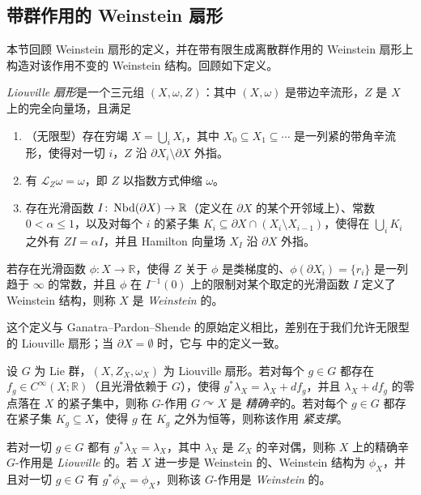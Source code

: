 \subsection{带群作用的 Weinstein 扇形}
本节回顾 Weinstein 扇形的定义，并在带有限生成离散群作用的 Weinstein 扇形上构造对该作用不变的 Weinstein 结构。回顾如下定义。

\begin{dfn}\label{defn:Liouville-sector-inf}
    \emph{Liouville 扇形}是一个三元组 $(X,\omega,Z)$：其中 $(X,\omega)$ 是带边辛流形，$Z$ 是 $X$ 上的完全向量场，且满足
    \begin{enumerate}[label=(\roman*)]
        \item （无限型）存在穷竭 $X=\displaystyle\bigcup_i X_i$，其中 $X_0\subseteq X_1\subseteq\dotsb$ 是一列紧的带角辛流形，使得对一切 $i$，$Z$ 沿 $\partial X_i\setminus\partial X$ 外指。
        \item 有 $\mathcal{L}_Z\omega =\omega$，即 $Z$ 以指数方式伸缩 $\omega$。
        \item 存在光滑函数 $I\colon\operatorname{Nbd} (\partial X)\to\mathbb{R}$（定义在 $\partial X$ 的某个开邻域上）、常数 $0<\alpha\leq 1$，以及对每个 $i$ 的紧子集 $K_i\subseteq\partial X\cap (X_i\setminus X_{i-1})$，使得在 $\displaystyle\bigcup_i K_i$ 之外有 $ZI=\alpha I$，并且 Hamilton 向量场 $X_I$ 沿 $\partial X$ 外指。
    \end{enumerate}
    若存在光滑函数 $\phi\colon X\to\mathbb{R}$，使得 $Z$ 关于 $\phi$ 是类梯度的、$\phi(\partial X_i)=\{r_i\}$ 是一列趋于 $\infty$ 的常数，并且 $\phi$ 在 $I^{-1}(0)$ 上的限制对某个取定的光滑函数 $I$ 定义了 Weinstein 结构，则称 $X$ 是 \emph{Weinstein} 的。
\end{dfn}

这个定义与 Ganatra--Pardon--Shende \cite{GPS20} 的原始定义相比，差别在于我们允许无限型的 Liouville 扇形；当 $\partial X=\emptyset$ 时，它与 \cite{CE12} 中的定义一致。

\begin{dfn}\label{defn:G-invariant-Weinstein-sector}
    设 $G$ 为 Lie 群，$(X,Z_X,\omega_X)$ 为 Liouville 扇形。若对每个 $g\in G$ 都存在 $f_g\in C^{\infty} (X;\mathbb{R})$（且光滑依赖于 $G$），使得 $g^{\ast}\lambda_X =\lambda_X +df_g$，并且 $\lambda_X +df_g$ 的零点落在 $X$ 的紧子集中，则称 $G$-作用 $G\curvearrowright X$ 是 \emph{精确辛}的。若对每个 $g\in G$ 都存在紧子集 $K_g\subseteq X$，使得 $g$ 在 $K_g$ 之外为恒等，则称该作用 \emph{紧支撑}。\par
    若对一切 $g\in G$ 都有 $g^{\ast}\lambda_X =\lambda_X$，其中 $\lambda_X$ 是 $Z_X$ 的辛对偶，则称 $X$ 上的精确辛 $G$-作用是 \emph{Liouville} 的。若 $X$ 进一步是 Weinstein 的、Weinstein 结构为 $\phi_X$，并且对一切 $g\in G$ 有 $g^{\ast}\phi_X =\phi_X$，则称该 $G$-作用是 \emph{Weinstein} 的。
\end{dfn}

